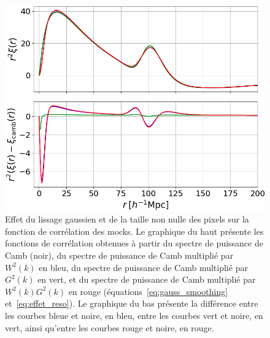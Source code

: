\begin{figure}
  \centering
  \includegraphics[scale=0.38]{xi_smoothing}
  \caption{Effet du lissage gaussien et de la taille non nulle des pixels sur la fonction de corrélation des mocks. Le graphique du haut présente les fonctions de corrélation obtenues à partir du spectre de puissance de Camb (noir), du spectre de puissance de Camb multiplié par $W^2(k)$ en bleu, du spectre de puissance de Camb multiplié par $G^2(k)$ en vert, et du spectre de puissance de Camb multiplié par $W^2(k)G^2(k)$ en rouge (équations~\ref{eq:gauss_smoothing} et~\ref{eq:effet_reso}). Le graphique du bas présente la différence entre les courbes bleue et noire, en bleu, entre les courbes vert et noire, en vert, ainsi qu'entre les courbes rouge et noire, en rouge.}
  \label{fig:xi_smoothing}
\end{figure}
